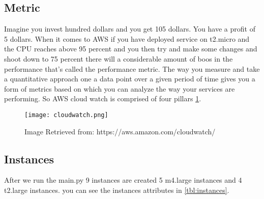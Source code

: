 \documentclass[12pt]{article}
\begin{document}
        \subsection{Metric}
        Imagine you invest hundred dollars and you get 105 dollars. You have a profit of 5 dollars.
        When it comes to AWS if you have deployed service on t2.micro and the CPU reaches above 95 percent and you then try and make some changes and shoot down to 75 percent there will a considerable amount of boos in the performance that's called the performance metric. The way you measure and take a quantitative approach one a data point over a given period of time gives you a form of metrics based on which you can analyze the way your services are performing. So AWS cloud watch is comprised of four pillars \ref{fig:cw}.

        \begin{figure}[htpb]
        \captionsetup{font=footnotesize,labelfont=footnotesize}
        \centering
        \texttt{[image: cloudwatch.png]}
            \caption{Image Retrieved from: https://aws.amazon.com/cloudwatch/}
            \label{fig:cw}
        \end{figure}

        \subsection{Instances}
        After we run the main.py 9 instances are created 5 m4.large instances and 4 t2.large instances. you can see the instances attributes in \ref{tbl:instances}. 

        \begin{table}[]
            \centering
        \caption{Instances Specifications}
            \label{tbl:instances}
        \end{table}
\end{document}
